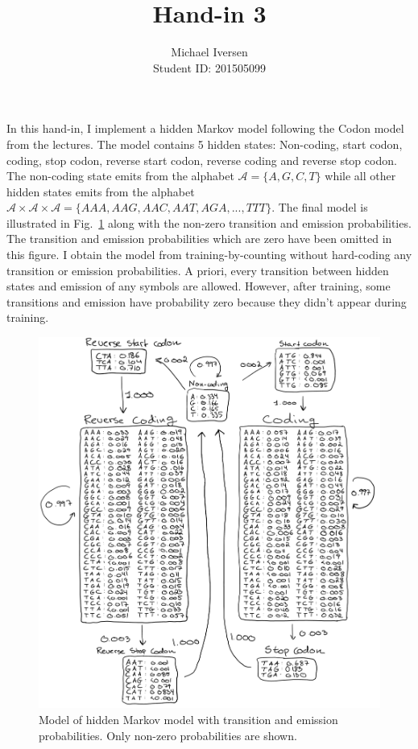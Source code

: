 \documentclass[11pt]{article}
\title{Hand-in 3}
\author{Michael Iversen\\
Student ID: 201505099}
\begin{document}
\maketitle
In this hand-in, I implement a hidden Markov model following the Codon model from the lectures.
The model contains 5 hidden states: Non-coding, start codon, coding, stop codon, reverse start codon, reverse coding and reverse stop codon.
The non-coding state emits from the alphabet $\mathcal A = \{A, G, C, T\}$ while all other hidden states emits from the alphabet $\mathcal A \times \mathcal A \times \mathcal A = \{AAA, AAG, AAC, AAT, AGA, ..., TTT\}$.
The final model is illustrated in Fig.\ \ref{fig:model} along with the non-zero transition and emission probabilities.
The transition and emission probabilities which are zero have been omitted in this figure.
I obtain the model from training-by-counting without hard-coding any transition or emission probabilities.
A priori, every transition between hidden states and emission of any symbols are allowed.
However, after training, some transitions and emission have probability zero because they didn't appear during training.
\begin{figure}
	\centering
	\includegraphics[width=\textwidth]{Illustration.png}
	\caption{
		Model of hidden Markov model with transition and emission probabilities.
		Only non-zero probabilities are shown.
	}
	\label{fig:model}
\end{figure}
\end{document}
